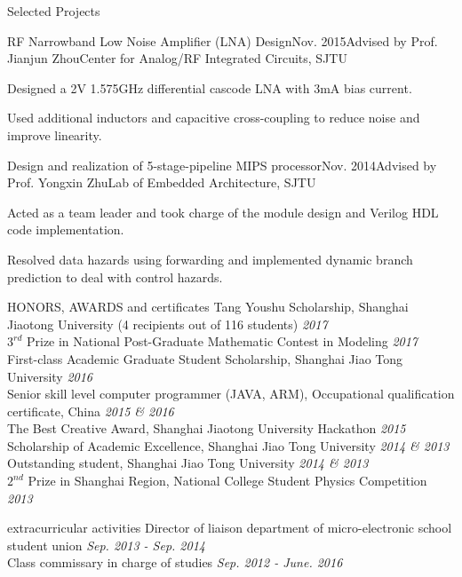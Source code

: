 \documentclass{resume_Stanford} %
\begin{document}
\begin{rSection}{Selected Projects}
\begin{rSubsection}{RF Narrowband Low Noise Amplifier (LNA) Design}{Nov. 2015}{Advised by Prof. Jianjun Zhou}{Center for Analog/RF Integrated Circuits, SJTU}
\item Designed a 2V 1.575GHz differential cascode LNA with 3mA bias current.
\item Used additional inductors and capacitive cross-coupling to reduce noise and improve linearity.
\end{rSubsection}

\begin{rSubsection}{Design and realization of 5-stage-pipeline MIPS processor}{Nov. 2014}{Advised by Prof. Yongxin Zhu}{Lab of Embedded Architecture, SJTU}
\item Acted as a team leader and took charge of the module design and Verilog HDL code implementation. 
\item Resolved data hazards using forwarding and implemented dynamic branch prediction to deal with control hazards.
\end{rSubsection}
\end{rSection}

\begin{rSection}{HONORS, AWARDS and certificates}
Tang Youshu Scholarship, Shanghai Jiaotong University (4 recipients out of 116 students) \hfill \emph{2017}
\\$3^{rd}$ Prize in National Post-Graduate Mathematic Contest in Modeling \hfill \emph{2017}
\\First-class Academic Graduate Student Scholarship, Shanghai Jiao Tong University  \hfill \emph{2016}
\\Senior skill level computer programmer (JAVA, ARM), Occupational qualification certificate, China \hfill \emph{2015 \& 2016}
\\The Best Creative Award, Shanghai Jiaotong University Hackathon \hfill \emph{2015}
\\Scholarship of Academic Excellence, Shanghai Jiao Tong University \hfill \emph{2014 \& 2013}
\\Outstanding student, Shanghai Jiao Tong University \hfill \emph{2014 \& 2013}
\\$2^{nd}$ Prize in Shanghai Region, National College Student Physics Competition \hfill \emph{2013}
\end{rSection}

\begin{rSection}{extracurricular activities}
Director of liaison department of micro-electronic school student union \hfill \emph{Sep. 2013 - Sep. 2014}
\\Class commissary in charge of studies  \hfill \emph{Sep. 2012 - June. 2016}
\end{rSection}
\end{document}
